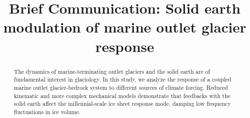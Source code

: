 \documentclass[tc, manuscript]{copernicus}
\begin{document}
\title{Brief Communication: Solid earth modulation of marine outlet glacier response}

















\received{}
\pubdiscuss{} %
\revised{}
\accepted{}
\published{}




\maketitle



\begin{abstract}
The dynamics of marine-terminating outlet glaciers and the solid earth are of fundamental interest in glaciology.
In this study, we analyze the response of a coupled marine outlet glacier-bedrock system to different sources of climate forcing.
Reduced kinematic and more complex mechanical models demonstrate that feedbacks with the solid earth affect the millennial-scale ice sheet response mode, damping low frequency fluctuations in ice volume.


\end{abstract}
\end{document}
